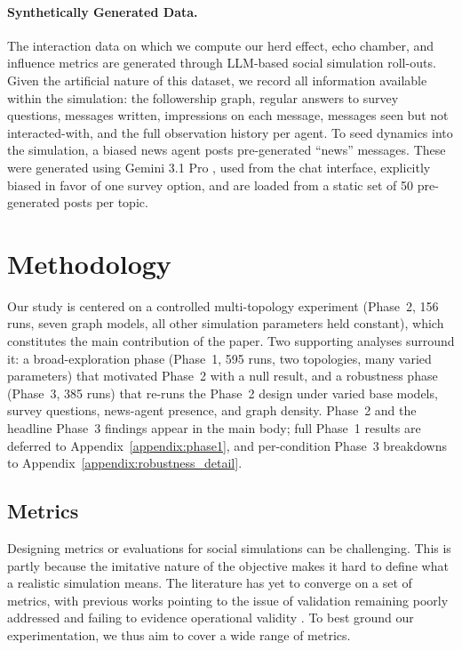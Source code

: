 \documentclass[11pt]{article}
\begin{document}
\paragraph{Synthetically Generated Data.} The interaction data on which we compute our herd effect, echo chamber, and influence metrics are generated through LLM-based social simulation roll-outs. Given the artificial nature of this dataset, we record all information available within the simulation: the followership graph, regular answers to survey questions, messages written, impressions on each message, messages seen but not interacted-with, and the full observation history per agent. To seed dynamics into the simulation, a biased news agent posts pre-generated ``news'' messages. These were generated using Gemini 3.1 Pro \cite{geminiteam2025geminifamilyhighlycapable}, used from the chat interface, explicitly biased in favor of one survey option, and are loaded from a static set of 50 pre-generated posts per topic.

\section{Methodology}

Our study is centered on a controlled multi-topology experiment (Phase~2, 156 runs, seven graph models, all other simulation parameters held constant), which constitutes the main contribution of the paper. Two supporting analyses surround it: a broad-exploration phase (Phase~1, 595 runs, two topologies, many varied parameters) that motivated Phase~2 with a null result, and a robustness phase (Phase~3, 385 runs) that re-runs the Phase~2 design under varied base models, survey questions, news-agent presence, and graph density. Phase~2 and the headline Phase~3 findings appear in the main body; full Phase~1 results are deferred to Appendix~\ref{appendix:phase1}, and per-condition Phase~3 breakdowns to Appendix~\ref{appendix:robustness_detail}.

\subsection{Metrics}

Designing metrics or evaluations for social simulations can be challenging. This is partly because the imitative nature of the objective makes it hard to define what a realistic simulation means. The literature has yet to converge on a set of metrics, with previous works pointing to the issue of validation remaining poorly addressed and failing to evidence operational validity \cite{larooij2025largelanguagemodelssolve}. To best ground our experimentation, we thus aim to cover a wide range of metrics. 
\end{document}

